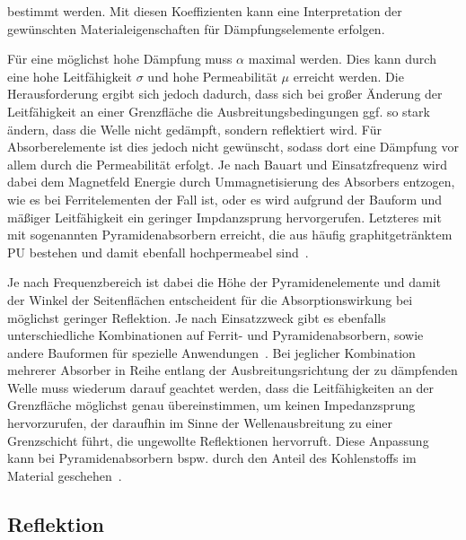 bestimmt werden. Mit diesen Koeffizienten kann eine Interpretation der gewünschten Materialeigenschaften für Dämpfungselemente erfolgen. 
\par
\vspace{\linespace}
Für eine möglichst hohe Dämpfung muss $\alpha$ maximal werden. Dies kann durch eine hohe Leitfähigkeit $\sigma$ und hohe Permeabilität $\mu$ erreicht werden. Die Herausforderung ergibt sich jedoch dadurch, dass sich bei großer Änderung der Leitfähigkeit an einer Grenzfläche die Ausbreitungsbedingungen ggf. so stark ändern, dass die Welle nicht gedämpft, sondern reflektiert wird. Für Absorberelemente ist dies jedoch nicht gewünscht, sodass dort eine Dämpfung vor allem durch die Permeabilität erfolgt. Je nach Bauart und Einsatzfrequenz wird dabei dem Magnetfeld Energie durch Ummagnetisierung des Absorbers entzogen, wie es bei Ferritelementen der Fall ist, oder es wird aufgrund der Bauform und mäßiger Leitfähigkeit ein geringer Impdanzsprung hervorgerufen. Letzteres mit mit sogenannten Pyramidenabsorbern erreicht, die aus häufig graphitgetränktem \ac{PU} bestehen und damit ebenfall hochpermeabel sind~\cite{EM_Schirmung}. 
\par
\vspace{\linespace}
Je nach Frequenzbereich ist dabei die Höhe der Pyramidenelemente und damit der Winkel der Seitenflächen entscheident für die Absorptionswirkung bei möglichst geringer Reflektion. Je nach Einsatzzweck gibt es ebenfalls unterschiedliche Kombinationen auf Ferrit- und Pyramidenabsorbern, sowie andere Bauformen für spezielle Anwendungen~\cite{EMV-Support_Produktseite, Telemeter_Produktseite}. Bei jeglicher Kombination mehrerer Absorber in Reihe entlang der Ausbreitungsrichtung der zu dämpfenden Welle muss wiederum darauf geachtet werden, dass die Leitfähigkeiten an der Grenzfläche möglichst genau übereinstimmen, um keinen Impedanzsprung hervorzurufen, der daraufhin im Sinne der Wellenausbreitung zu einer Grenzschicht führt, die ungewollte Reflektionen hervorruft. Diese Anpassung kann bei Pyramidenabsorbern bspw. durch den Anteil des Kohlenstoffs im Material geschehen~\cite{EM_Schirmung}.




\subsection{Reflektion}\label{cha:2_sub_Reflektion}


